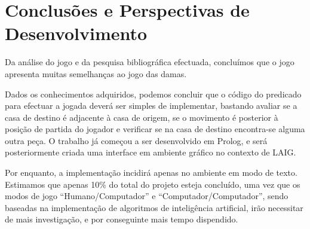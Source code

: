 \documentclass[15pt,a4paper]{article}
\begin{document}
\newpage

\section{Conclusões e Perspectivas de Desenvolvimento}


Da análise do jogo e da pesquisa bibliográfica efectuada, concluímos que o jogo apresenta muitas semelhanças ao jogo das damas.

Dados os conhecimentos adquiridos, podemos concluir que o código do predicado para efectuar a jogada deverá ser simples de implementar, bastando avaliar se a casa de destino é adjacente à casa de origem, se o movimento é posterior à posição de partida do jogador e verificar se na casa de destino encontra-se alguma outra peça. 
O trabalho já começou a ser desenvolvido em Prolog, e será posteriormente criada uma interface em ambiente gráfico no contexto de LAIG.

 Por enquanto, a implementação incidirá apenas no ambiente em modo de texto.
Estimamos que apenas 10\% do total do projeto esteja concluído, uma vez que os modos de jogo ``Humano/Computador'' e ``Computador/Computador'', sendo baseadas na implementação de algoritmos de inteligência artificial, irão necessitar de mais investigação, e por conseguinte mais tempo dispendido.




\clearpage

\renewcommand\refname{Bibliografia}



\nocite{tut1}
\nocite{tut2}


\newpage
\end{document}
